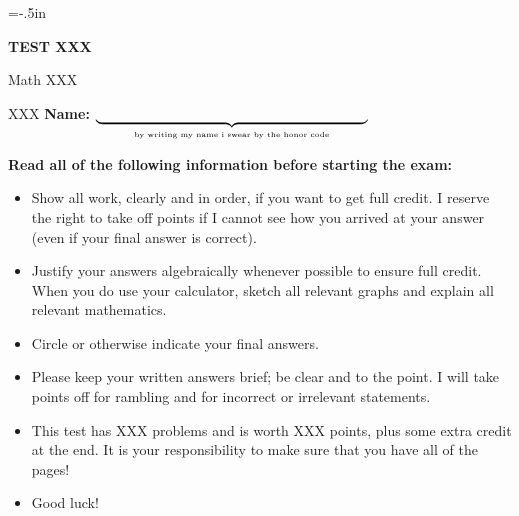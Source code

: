 


\oddsidemargin=0in
\evensidemargin=0in
\textwidth=6.3in
\topmargin=-.5in
\textheight=9in

\parindent=0in
\pagestyle{empty}







\centerline{\huge \bf TEST XXX}        %
\vfill \vfill
   
Math XXX                               %

XXX \hfill                             %
{\bf Name: } $\underbrace{\hspace{2.7in}}_{\mbox{\tiny by writing my 
                                           name i swear by the honor code}}$
\vfill \vfill \vfill

{\bf Read all of the following information before starting the exam:}
\vspace{1pc}

\begin{itemize}                        %
	\item  Show all work, clearly and in order, if you want to get full
	credit.  I reserve the right to take off points if I cannot see how you 
	arrived at your answer (even if your final answer is correct).
	
	\item Justify your answers algebraically whenever possible to ensure 
	full credit. When you do use your calculator, sketch all relevant 
	graphs and explain all relevant mathematics.
	
	\item  Circle or otherwise indicate your final answers.

	\item  Please keep your written answers brief; be clear and to the point.
	I will take points off for rambling and for incorrect or irrelevant 
	statements.
		
	\item  This test has XXX problems  %
	and is worth XXX points,           %
	plus some extra credit at the end.  It is your responsibility to 
	make sure that you have all of the pages!
	
	\item  Good luck!
\end{itemize}

